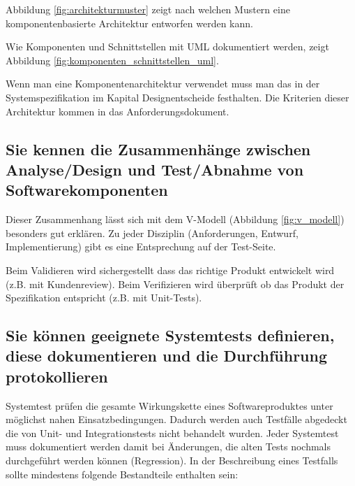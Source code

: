 Abbildung \ref{fig:architekturmuster} zeigt nach welchen Mustern eine komponentenbasierte Architektur entworfen werden kann.


Wie Komponenten und Schnittstellen mit UML dokumentiert werden, zeigt Abbildung \ref{fig:komponenten_schnittstellen_uml}.


Wenn man eine Komponentenarchitektur verwendet muss man das in der Systemspezifikation im Kapital Designentscheide festhalten. Die Kriterien dieser Architektur kommen in das Anforderungsdokument.

\subsection{Sie kennen die Zusammenhänge zwischen Analyse/Design und Test/Abnahme von Softwarekomponenten}

Dieser Zusammenhang lässt sich mit dem V-Modell (Abbildung \ref{fig:v_modell}) besonders gut erklären. Zu jeder Disziplin (Anforderungen, Entwurf, Implementierung) gibt es eine Entsprechung auf der Test-Seite. 


Beim Validieren wird sichergestellt dass das richtige Produkt entwickelt wird (z.B. mit Kundenreview). Beim Verifizieren wird überprüft ob das Produkt der Spezifikation entspricht (z.B. mit Unit-Tests).

\newpage

\subsection{Sie können geeignete Systemtests definieren, diese dokumentieren und die Durchführung protokollieren}

Systemtest prüfen die gesamte Wirkungskette eines Softwareproduktes unter möglichst nahen Einsatzbedingungen. Dadurch werden auch Testfälle abgedeckt die von Unit- und Integrationstests nicht behandelt wurden. Jeder Systemtest muss dokumentiert werden damit bei Änderungen, die alten Tests nochmals durchgeführt werden können (Regression). In der Beschreibung eines Testfalls sollte mindestens folgende Bestandteile enthalten sein:


